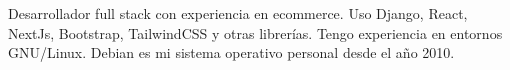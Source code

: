 


\begin{cvpubs}
  \cvpub
    {
      \begin{cvlist}
  \item {Desarrollador full stack con experiencia en ecommerce. Uso Django, React, NextJs, Bootstrap, TailwindCSS y otras librerías. Tengo experiencia en entornos GNU/Linux. Debian es mi sistema operativo personal desde el año 2010. }
      \end{cvlist}
    }\vspace{-15pt}
\end{cvpubs}
